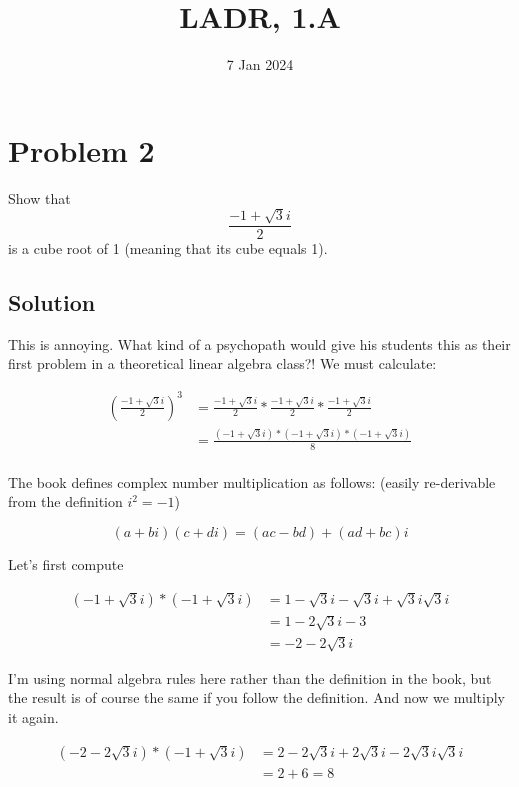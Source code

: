 \documentclass{article}
\title{LADR, 1.A}
\date{7 Jan 2024}
\begin{document}
\maketitle

\section*{Problem 2}
Show that
\[\frac{-1 + \sqrt{3}i}{2}\]
is a cube root of 1 (meaning that its cube equals 1).

\subsection*{Solution}

This is annoying. What kind of a psychopath would give his students this as their first problem in a theoretical linear algebra class?! We must calculate:

\begin{align*}
\left(\frac{-1 + \sqrt{3}i}{2} \right) ^ 3 &= \frac{-1 + \sqrt{3}i}{2} * \frac{-1 + \sqrt{3}i}{2} * \frac{-1 + \sqrt{3}i}{2}\\
&= \frac{\left(-1 + \sqrt{3}i\right) * \left(-1 + \sqrt{3}i\right) * \left(-1 + \sqrt{3}i\right)}{8}\\
\end{align*}

The book defines complex number multiplication as follows: (easily re-derivable from the definition $i^2=-1$)

\[\left(a+bi\right)\left(c+di\right)=\left(ac-bd\right)+\left(ad+bc\right)i\]

Let's first compute

\begin{align*}
\left(-1 + \sqrt{3}i\right) * \left(-1 + \sqrt{3}i\right) &= 1 - \sqrt{3}i - \sqrt{3}i + \sqrt{3}i\sqrt{3}i\\
&= 1 - 2\sqrt{3}i - 3\\
&= -2 - 2\sqrt{3}i
\end{align*}

I'm using normal algebra rules here rather than the definition in the book, but the result is of course the same if you follow the definition. And now we multiply it again.

\begin{align*}
\left(-2 - 2\sqrt{3}i\right) * \left(-1 + \sqrt{3}i\right) &= 2 - 2\sqrt{3}i +2\sqrt{3}i - 2\sqrt{3}i\sqrt{3}i\\
&= 2 + 6 = 8
\end{align*}
\end{document}

